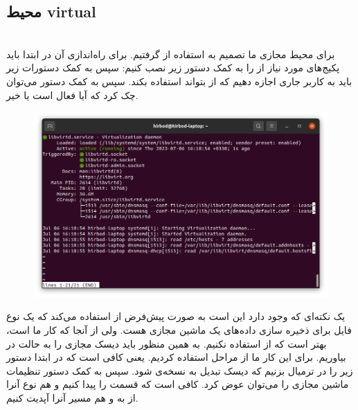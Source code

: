 \subsection{محیط‌ virtual}
\\
برای محیط مجازی ما تصمیم به استفاده از
گرفتیم. برای راه‌اندازی آن در ابتدا باید پکیج‌های مورد نیاز از
را به کمک دستور زیر نصب کنیم:
سپس به کمک دستورات زیر باید به کاربر جاری اجازه دهیم که از
بتواند استفاده بکند.
سپس به کمک دستور
می‌توان چک کرد که آیا
فعال است یا خیر.
\begin{figure}[H]
    \centering
    \includegraphics[scale=0.3]{pictures/intro/kvm.png}
    \caption{}
    \label{fig:into:kvm}
\end{figure}
یک نکته‌ای که وجود دارد این است به صورت پیش‌فرض
 از 
استفاده می‌کند که یک نوع فایل
برای ذخیره سازی داده‌های یک ماشین مجازی هست. ولی از آنجا که کار ما
است، بهتر است که از
استفاده نکنیم. به همین منظور باید دیسک مجازی را به حالت
در بیاوریم. برای این کار ما از
مراحل استفاده کردیم. یعنی کافی است که در ابتدا دستور زیر را در ترمیال بزنیم که دیسک تبدیل به نسخه‌ی
شود.
سپس به کمک دستور
تنظیمات ماشین مجازی را می‌توان عوض کرد. کافی است که قسمت
را پیدا کنیم و هم نوع آنرا از
 به 
و هم مسیر آنرا آپدیت کنیم.


